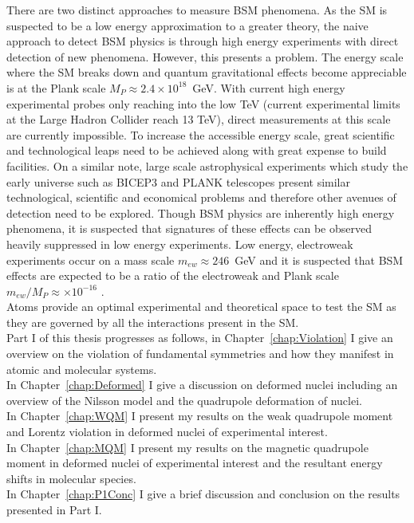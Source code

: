 \documentclass[10pt,a4paper, twoside, openright]{report}
\begin{document}
There are two distinct approaches to measure BSM phenomena. As the SM is suspected to be a low energy approximation to a greater theory, the naive approach to detect BSM physics is through high energy experiments with direct detection of new phenomena. However, this presents a problem. The energy scale where the SM breaks down and quantum gravitational effects become appreciable is at the Plank scale $M_P \approx 2.4 \times 10^{18}$~GeV. With current high energy experimental probes only reaching into the low TeV (current experimental limits at the Large Hadron Collider reach 13 TeV), direct measurements at this scale are currently impossible. To increase the accessible energy scale, great scientific and technological leaps need to be achieved along with great expense to build facilities. On a similar note, large scale astrophysical experiments which study the early universe such as BICEP3\cite{BICEP3} and PLANK\cite{PLANK2016} telescopes present similar technological, scientific and economical problems and therefore other avenues of detection need to be explored. Though BSM physics are inherently high energy phenomena, it is suspected that signatures of these effects can be observed heavily suppressed in low energy experiments. Low energy,  electroweak experiments occur on a mass scale $m_{ew} \approx 246$~GeV and it is suspected that BSM effects are expected to be a ratio of the electroweak and Plank scale $m_{ew}/M_P \approx \times 10^{-16}$  \cite{Kostelecky1995}. \\
\linebreak
Atoms provide an optimal experimental and theoretical space to test the SM as they are governed by all the interactions present in the SM. \\
\linebreak
Part I of this thesis progresses as follows, in Chapter~\ref{chap:Violation} I give an overview on the violation of fundamental symmetries and how  they manifest in atomic and molecular systems. \\
\linebreak
In Chapter~\ref{chap:Deformed} I give a discussion on deformed nuclei including an overview of the Nilsson model and the quadrupole deformation of nuclei. \\
\linebreak
In Chapter~\ref{chap:WQM} I present my results on the weak quadrupole moment and Lorentz violation in deformed nuclei of experimental interest. \\
\linebreak
In Chapter~\ref{chap:MQM} I present my results on the magnetic quadrupole moment in deformed nuclei of experimental interest and the resultant energy shifts in molecular species. \\
\linebreak
In Chapter~\ref{chap:P1Conc} I give a brief discussion and conclusion on the results presented in Part I. \\
\linebreak
\end{document}
